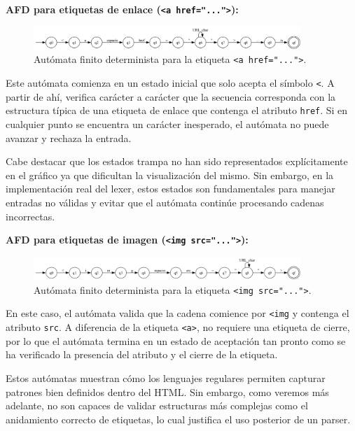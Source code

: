 \documentclass[11pt,a4paper]{article}
\begin{document}
\textbf{AFD para etiquetas de enlace (\texttt{<a href="...">}):}

\begin{figure}[H]
    \centering
    \includegraphics[width=0.9\textwidth]{img/afd_a_tag.png}
    \caption*{Autómata finito determinista para la etiqueta \texttt{<a href="...">}.}
\end{figure}

Este autómata comienza en un estado inicial que solo acepta el símbolo \texttt{<}. A partir de ahí, verifica carácter a carácter que la secuencia corresponda con la estructura típica de una etiqueta de enlace que contenga el atributo \texttt{href}. Si en cualquier punto se encuentra un carácter inesperado, el autómata no puede avanzar y rechaza la entrada.

\medskip

Cabe destacar que los estados trampa no han sido representados explícitamente en el gráfico ya que dificultan la visualización del mismo. Sin embargo, en la implementación real del lexer, estos estados son fundamentales para manejar entradas no válidas y evitar que el autómata continúe procesando cadenas incorrectas.

\vspace{1em}

\textbf{AFD para etiquetas de imagen (\texttt{<img src="...">}):}

\begin{figure}[H]
    \centering
    \includegraphics[width=0.9\textwidth]{img/afd_img_tag.png}
    \caption*{Autómata finito determinista para la etiqueta \texttt{<img src="...">}.}
\end{figure}

En este caso, el autómata valida que la cadena comience por \texttt{<img} y contenga el atributo \texttt{src}. A diferencia de la etiqueta \texttt{<a>}, no requiere una etiqueta de cierre, por lo que el autómata termina en un estado de aceptación tan pronto como se ha verificado la presencia del atributo y el cierre de la etiqueta.

\medskip

Estos autómatas muestran cómo los lenguajes regulares permiten capturar patrones bien definidos dentro del HTML. Sin embargo, como veremos más adelante, no son capaces de validar estructuras más complejas como el anidamiento correcto de etiquetas, lo cual justifica el uso posterior de un parser.
\end{document}
